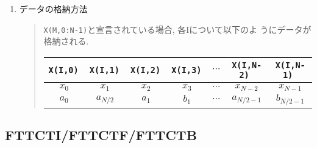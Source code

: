 \documentclass[a4j]{jarticle}
\begin{document}
\begin{enumerate}
  \item データの格納方法
  \begin{quote}

  {\tt X(M,0:N-1)}と宣言されている場合, 各Iについて以下のよ
   うにデータが格納される.

    \begin{tabular}{|c|c|c|c|c|c|c|}\hline
     \tt X(I,0) & \tt X(I,1) & \tt X(I,2) & \tt X(I,3) & 
     $\cdots$ & \tt X(I,N-2) & \tt X(I,N-1) \\\hline\hline
      $x_0$ & $x_1$ & $x_2$ & $x_3$ &
     $\cdots$ & $x_{N-2}$ & $x_{N-1}$ \\\hline
      $a_0$ & $a_{N/2}$ & $a_1$ & $b_1$ &
     $\cdots$ & $a_{N/2-1}$ & $b_{N/2-1}$ \\\hline
    \end{tabular}

  \end{quote}

\end{enumerate}

\subsection{FTTCTI/FTTCTF/FTTCTB}
\end{document}
